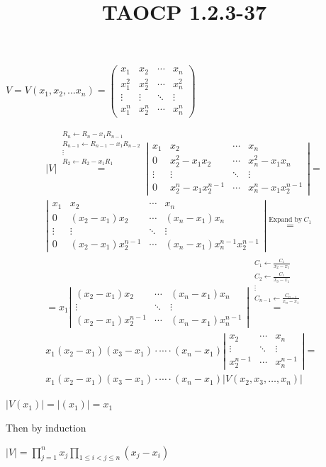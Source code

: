 \documentclass{article}
\title{TAOCP 1.2.3\mbox{-}37}
\begin{document}
\maketitle

\( V = V(x_{1}, x_{2}, \ldots x_{n}) = \left(\begin{matrix} x_{1} & x_{2} & \cdots & x_{n} \\ x_{1}^{2} & x_{2}^{2} & \cdots & x_{n}^{2} \\ \vdots & \vdots & \ddots & \vdots \\ x_{1}^{n} & x_{2}^{n} & \cdots & x_{n}^{n} \end{matrix}\right) \)

\begin{multline*}
|V| \overset{\substack{R_{n} \leftarrow R_{n} - x_{1} R_{n-1}\\ R_{n-1} \leftarrow R_{n-1} - x_{1} R_{n-2}\\ \vdots\\ R_{2} \leftarrow R_{2} - x_{1} R_{1}}}{=} \left|\begin{matrix} x_{1} & x_{2} & \cdots & x_{n} \\ 0 & x_{2}^{2} - x_{1}x_{2} & \cdots & x_{n}^{2}-x_{1}x_{n} \\ \vdots & \vdots & \ddots & \vdots \\ 0 & x_{2}^{n} - x_{1}x_{2}^{n-1} & \cdots & x_{n}^{n}-x_{1} x_{2}^{n-1} \end{matrix}\right| = \\
\left|\begin{matrix} x_{1} & x_{2} & \cdots & x_{n} \\ 0 & (x_{2}-x_{1})x_{2} & \cdots & (x_{n}-x_{1})x_{n} \\ \vdots & \vdots & \ddots & \vdots \\ 0 & (x_{2}-x_{1})x_{2}^{n-1} & \cdots & (x_{n}-x_{1})x_{n}^{n-1} x_{2}^{n-1} \end{matrix}\right| \overset{\text{Expand by}\ C_{1}}{=} \\
= x_{1} \left|\begin{matrix} (x_{2}-x_{1})x_{2} & \cdots & (x_{n}-x_{1})x_{n} \\ \vdots & \ddots & \vdots \\ (x_{2} - x_{1})x_{2}^{n-1} & \cdots & (x_{n}-x_{1})x_{n}^{n-1} \end{matrix}\right| \overset{\substack{C_{1} \leftarrow \frac{C_{1}}{x_{2}-x_{1}} \\ C_{2} \leftarrow \frac{C_{1}}{x_{3}-x_{1}} \\ \vdots \\ C_{n-1} \leftarrow \frac{C_{n-1}}{x_{n}-x_{1}}}}{=} \\
x_{1}(x_{2}-x_{1})(x_{3}-x_{1})\cdot \cdots \cdot(x_{n}-x_{1}) \left|\begin{matrix} x_{2} & \cdots & x_{n} \\ \vdots & \ddots & \vdots \\ x_{2}^{n-1} & \cdots & x_{n}^{n-1} \end{matrix}\right| = \\
x_{1}(x_{2}-x_{1})(x_{3}-x_{1})\cdot \cdots \cdot(x_{n}-x_{1}) |V(x_{2}, x_{3}, \ldots, x_{n})|
\end{multline*}

\( |V(x_{1})| = |(x_{1})| = x_{1} \)

Then by induction

\( |V| = \prod_{j=1}^{n} x_{j} \prod_{1\leq i < j \leq n} (x_{j} - x_{i}) \)
\end{document}
